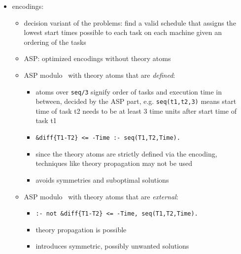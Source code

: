 \begin{itemize}
  \item encodings:
    \begin{itemize}
     \item decision variant of the problems: find a valid schedule that assigns the lowest start times possible to each task on each machine given an ordering of the tasks
     \item ASP: optimized encodings without theory atoms
     \item ASP modulo \DL\ with theory atoms that are \emph{defined}:
	  \begin{itemize}
	    \item atoms over {\tt seq/3} signify order of tasks and execution time in between, decided by the ASP part, 
	    e.g. {\tt seq(t1,t2,3)} means start time of task t2 needs to be at least 3 time units after start time of task t1
	    \item {\tt \&diff\{T1-T2\} <= -Time :- seq(T1,T2,Time).}
	    \item since the theory atoms are strictly defined via the encoding, techniques like theory propagation may not be used
	    \item avoids symmetries and suboptimal solutions
	  \end{itemize}
     \item ASP modulo \DL\ with theory atoms that are \emph{external}:
	  \begin{itemize}
	    \item {\tt :- not \&diff\{T1-T2\} <= -Time, seq(T1,T2,Time).}
	    \item theory propagation is possible
	    \item introduces symmetric, possibly unwanted solutions
	  \end{itemize}
    \end{itemize}


\end{itemize}
